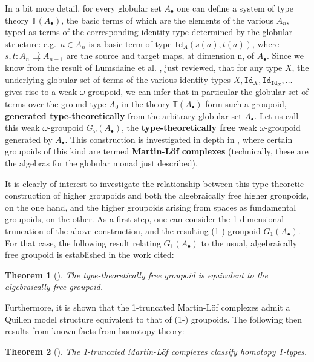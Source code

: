 \documentclass[reqno,12pt]{amsart}
\newcommand{\T}{\ensuremath{\mathbb{T}}}
\newcommand{\A}{A_\bullet}
\newcommand{\myemph}[1]{\textbf{#1}}    %
\newcommand{\id}[1]{\texttt{Id}_{#1}}
\newtheorem{theorem}{Theorem}[section]
\theoremstyle{definition}
\theoremstyle{remark}
\begin{document}
In a bit more detail, for every globular set $\A$ one can define a system of type theory  $\T(\A)$, the basic terms of which are the elements of the various $A_n$, typed as terms of the corresponding identity type determined by the globular structure: e.g.\ $a\in A_n$ is a basic term of type $\id{A}(s(a), t(a))$, where $s,t :A_n \rightrightarrows A_{n-1}$  are the source and target maps, at dimension n, of $\A$.  Since we know from the result of Lumsdaine et al. \cite{Lumsdaine:WOITT,Berg:TWOG},
just reviewed, that for any type $X$, the underlying globular set of terms of the various identity types $X, \id{X}, \id{\id{X}}, \dots$ gives rise to a weak $\omega$-groupoid, we can infer that in particular the globular set of terms over the ground type $A_0$ in the theory $\T(\A)$ form such a groupoid, \myemph{generated type-theoretically} from the arbitrary globular set $\A$.  Let us call this weak $\omega$-groupoid $G_{\omega}(\A)$, the \myemph{type-theoretically free} weak $\omega$-groupoid generated by $\A$.  This construction is investigated in depth in \cite{AHW:MLC},  where certain groupoids of this kind are termed \myemph{Martin-L\"of complexes} (technically, these are the algebras for the globular monad just described).  

It is clearly of interest to investigate the relationship between this type-theoretic construction of higher groupoids and both the algebraically free higher groupoids, on the one hand, and the higher group\-oids arising from spaces as fundamental groupoids, on the other.  As a first step, one can consider the 1-dimensional truncation of the above construction, and the resulting (1-) groupoid $G_{1}(\A)$.  For that case, the following result relating $G_{1}(\A)$ to the usual, algebraically free groupoid is established in the work cited:

\begin{theorem}[\cite{AHW:MLC}] The type-theoretically free groupoid is equivalent to the algebraically free groupoid.
\end{theorem}

Furthermore, it is shown that the 1-truncated Martin-L\"of complexes admit a Quillen model structure equivalent to that of (1-) groupoids.  The following then results from known facts from homotopy theory:

\begin{theorem}[\cite{AHW:MLC}] The 1-truncated Martin-L\"of complexes classify homotopy 1-types.
\end{theorem}
\end{document}
